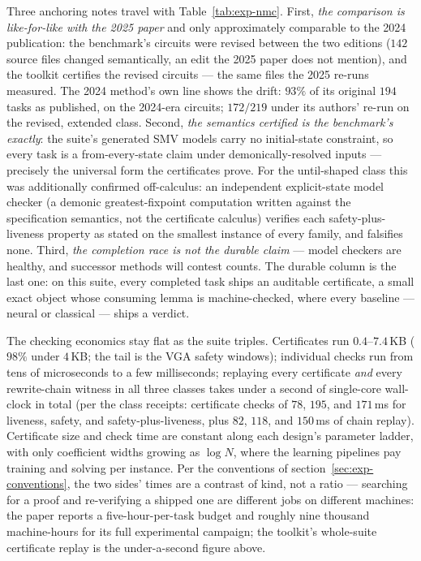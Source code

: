 Three anchoring notes travel with Table~\ref{tab:exp-nmc}. First,
\emph{the comparison is like-for-like with the 2025 paper} and only
approximately comparable to the 2024 publication: the benchmark's
circuits were revised between the two editions ($142$ source files
changed semantically, an edit the 2025 paper does not mention), and the
toolkit certifies the revised circuits --- the same files the 2025
re-runs measured. The 2024 method's own line shows the drift: $93\%$
of its original $194$ tasks as published, on the 2024-era circuits;
$172/219$ under its authors' re-run on the revised, extended class. Second, \emph{the semantics certified is the benchmark's
exactly}: the suite's generated SMV models carry no initial-state
constraint, so every task is a from-every-state claim under
demonically-resolved inputs --- precisely the universal form the
certificates prove. For the until-shaped class this was additionally
confirmed off-calculus: an independent explicit-state model checker (a
demonic greatest-fixpoint computation written against the
specification semantics, not the certificate calculus) verifies each
safety-plus-liveness property as stated on the smallest instance of
every family, and falsifies none. Third, \emph{the completion race is
not the durable claim} --- model checkers are healthy, and successor
methods will contest counts. The durable column is the last one: on
this suite, every completed task ships an auditable certificate, a
small exact object whose consuming lemma is machine-checked, where
every baseline --- neural or classical --- ships a verdict.

The checking economics stay flat as the suite triples. Certificates
run $0.4$--$7.4$\,KB ($98\%$ under $4$\,KB; the tail is the VGA safety
windows); individual checks run from tens of microseconds to
a few milliseconds; replaying every certificate \emph{and} every
rewrite-chain witness in all three classes takes under a second of
single-core wall-clock in total (per the class receipts: certificate
checks of $78$, $195$, and $171$\,ms for liveness, safety, and
safety-plus-liveness, plus $82$, $118$, and $150$\,ms of chain
replay). Certificate size and check time are constant along each
design's parameter ladder, with only coefficient widths growing as
$\log N$, where the learning pipelines pay training and solving per
instance. Per the conventions of section~\ref{sec:exp-conventions},
the two sides' times are a contrast of kind, not a ratio --- searching
for a proof and re-verifying a shipped one are different jobs on
different machines: the paper reports a five-hour-per-task budget and
roughly nine thousand machine-hours for its full experimental
campaign; the toolkit's whole-suite certificate replay is the
under-a-second figure above.

